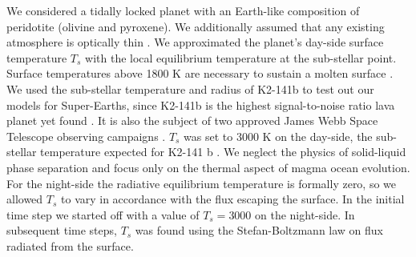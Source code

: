 \documentclass[fleqn,usenatbib]{mnras}
\begin{document}
We considered a tidally locked planet with an Earth-like composition of peridotite (olivine and pyroxene). We additionally assumed that any existing atmosphere is optically thin \citep{Castan2011, Nguyen2020, Nguyen2022}. We approximated the planet's day-side surface temperature $T_{s}$ with the local equilibrium temperature at the sub-stellar point. Surface temperatures above 1800 K are necessary to sustain a molten surface \citep{Kite2016}. We used the sub-stellar temperature and radius of K2-141b to test out our models for Super-Earths, since K2-141b is the highest signal-to-noise ratio lava planet yet found \citep{Barragan2018, Malavolta2018}. It is also the subject of two approved James Webb Space Telescope observing campaigns \citep{Dang2021, Espinoza2021}. $T_{s}$ was set to 3000 K on the day-side, the sub-stellar temperature expected for K2-141 b \citep{Malavolta2018}. We neglect the physics of solid-liquid phase separation and focus only on the thermal aspect of magma ocean evolution. For the night-side the radiative equilibrium temperature is formally zero, so we allowed $T_{s}$ to vary in accordance with the flux escaping the surface. In the initial time step we started off with a value of $T_{s} = 3000$ on the night-side. In subsequent time steps, $T_{s}$ was found using the Stefan-Boltzmann law on flux radiated from the surface. 
\end{document}
